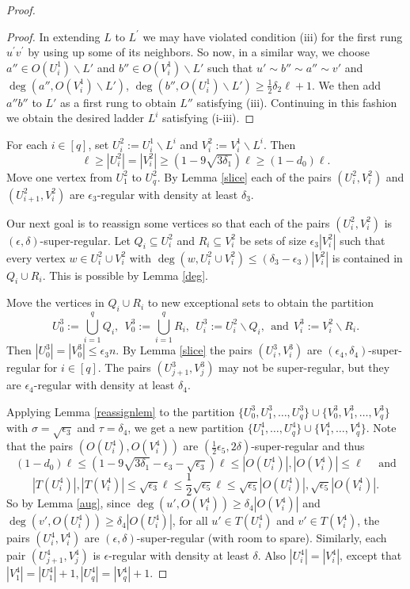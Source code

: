 \documentclass[oneside,12pt]{memoir}
\newcommand{\ep}{\epsilon}
\newcommand{\half}{\frac{1}{2}}
\newcommand{\ssm}{\smallsetminus}
\begin{document}
\begin{proof}
\begin{proof}
In extending $L$ to $L^{\prime }$ we may have violated
condition (iii) for the first rung $u^{\prime }v^{\prime }$ by using up some
of its neighbors. So now, in a similar way, we choose $a''\in
O(U_{i}^1)\smallsetminus L'$ and $b''\in
O(V_{i}^1)\smallsetminus L'$ such that $u'\sim b''\sim a''\sim v'$ and $\deg(a'',O(V_{i}^1)\smallsetminus L')$, $\deg(b'',O(U_{i}^1)\smallsetminus L') \geq \frac{1}{2}\delta_2\ell+1$. We
then add $a''b''$ to $L'$ as a first
rung to obtain $L''$ satisfying (iii).  Continuing in this fashion we obtain the desired ladder $L^{i}$ satisfying (i-iii).
\end{proof}

For each $i\in [q] $, set $U_{i}^{2}:=U_{i}^1\smallsetminus L^{i}$ and $V_{i}^{2}:=V_{i}^1\smallsetminus L^{i}$.  Then
\[
\ell\geq |U_i^2|=|V_i^2| \geq \left(1-9\sqrt{3\delta _{1}}\right) \ell \geq (1-d_0)\ell.
\]
Move one vertex from $U_1^2$ to $U_q^2$.  By Lemma \ref{slice} each of the pairs $( U_{i}^{2},V_{i}^{2})$ and $(U_{i+1}^{2}, V_{i}^{2}) $ are $\ep_3$-regular
with density at least $\delta_3$.

Our next goal is to reassign some vertices so that each of
the pairs $\left(U_{i}^{2},V_{i}^{2}\right) $ is $(\ep,\delta)$-super-regular.
Let $Q_i\subseteq U_i^2$ and $R_i\subseteq V_i^2$ be sets of size $\ep_3|V_i^2|$ 
such that every vertex $w\in U_i^2\cup V_i^2$ with $\deg(w,U_i^2\cup V_i^2) \leq (\delta_{3}-\ep _{3}) |V_i^{2}| $ is contained in $Q_i\cup R_i$. This is possible by Lemma \ref{deg}. %
 
Move the vertices in $Q_i\cup R_i$ to new exceptional sets to obtain the partition  $$U_0^3:= \bigcup_{i=1}^q Q_i, ~~V_0^3:= \bigcup_{i=1}^q R_i,~~U_i^3:=U_i^2\ssm Q_i, ~~\text{and}~~V_i^3:=V_i^2\ssm R_i.$$
   Then $|U_{0}^3|=|V_{0}^3| \leq \ep _{3}n$. 
By Lemma \ref{slice} the pairs $(U_i^3,V_i^3)$ are $(\ep_4,\delta_4)$-super-regular for $i\in[q]$.  The pairs $(U_{j+1}^3,V_j^3)$ may not be super-regular, but they are $\ep_4$-regular with density at least $\delta_4$.

Applying Lemma \ref{reassignlem} to the partition $\{U_0^3, U_1^3,\dots,U_q^3\}\cup\{V_0^3,V_1^3,\dots,V_q^3\}$ with $\sigma=\sqrt{\ep_3}$ and $\tau=\delta_4$, we get a new partition $\{ U_1^4,\dots,U_q^4\}\cup\{V_1^4,\dots,V_q^4\}$. Note that the pairs $(O(U_i^4),O(V_i^4))$ are
 $(\half \ep_5,2\delta)$-super-regular and thus 
$$(1-d_0)\ell\le (1-9\sqrt{3\delta _{1}}-\ep_3-\sqrt{\ep_3})\ell\leq |O(U_i^4)|,|O(V_i^4)|\leq \ell \text{~~~~and}$$  
$$|T(U_i^4)|,|T(V_i^4)|\leq\sqrt{\ep_3}\ell \leq \half\sqrt{\ep_5}\ell\leq\sqrt{\ep_5}|O(U_i^4)|,\sqrt{\ep_5}|O(V_i^4)|. $$
So by Lemma \ref{aug}, since $\deg(u',O(V_i^4))\geq \delta_4|O(V_i^4)|$ and $\deg(v',O(U_i^4))\geq \delta_4|O(U_i^4)|$, for all $u'\in T(U_i^4)$ and $v'\in T(V_i^4)$,  the pairs $(U_i^4,V_i^4)$ are $(\ep,\delta)$-super-regular (with room to spare).  Similarly, each pair $(U_{j+1}^{4},V_{j}^{4}) $ is $\ep$-regular with density at least $\delta$. Also $|U_i^4|=|V_i^4|$, except that $|V_1^4|=|U_1^4|+1, |U_q^4|=|V_q^4|+1$.


\end{proof}
\end{document}
